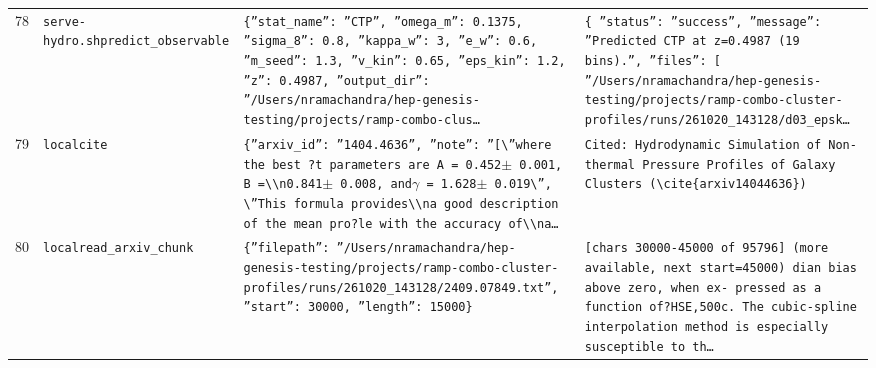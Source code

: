 \documentclass[11pt,a4paper]{article}
\begin{document}
\begin{longtable}{@{}p{}p{}p{}p{}@{}}
78 & \texttt{serve-hydro.sh}\newline\texttt{predict\_\allowbreak{}observable} & \texttt{\{''stat\_\allowbreak{}name'':\allowbreak{} ''CTP'',\allowbreak{} ''omega\_\allowbreak{}m'':\allowbreak{} 0.1375,\allowbreak{} ''sigma\_\allowbreak{}8'':\allowbreak{} 0.8,\allowbreak{} ''kappa\_\allowbreak{}w'':\allowbreak{} 3,\allowbreak{} ''e\_\allowbreak{}w'':\allowbreak{} 0.6,\allowbreak{} ''m\_\allowbreak{}seed'':\allowbreak{} 1.3,\allowbreak{} ''v\_\allowbreak{}kin'':\allowbreak{} 0.65,\allowbreak{} ''eps\_\allowbreak{}kin'':\allowbreak{} 1.2,\allowbreak{} ''z'':\allowbreak{} 0.4987,\allowbreak{} ''output\_\allowbreak{}dir'':\allowbreak{} ''/\allowbreak{}Users/\allowbreak{}nramachandra/\allowbreak{}hep-genesis-testing/\allowbreak{}projects/\allowbreak{}ramp-combo-clus\ldots{}\allowbreak{}} & \texttt{\{   ''status'':\allowbreak{} ''success'',\allowbreak{}   ''message'':\allowbreak{} ''Predicted CTP at z=\allowbreak{}0.4987 (19 bins)\allowbreak{}.'',\allowbreak{}   ''files'':\allowbreak{} [     ''/\allowbreak{}Users/\allowbreak{}nramachandra/\allowbreak{}hep-genesis-testing/\allowbreak{}projects/\allowbreak{}ramp-combo-cluster-profiles/\allowbreak{}runs/\allowbreak{}261020\_\allowbreak{}143128/\allowbreak{}d03\_\allowbreak{}epsk\ldots{}\allowbreak{}} \\
79 & \texttt{local}\newline\texttt{cite} & \texttt{\{''arxiv\_\allowbreak{}id'':\allowbreak{} ''1404.4636'',\allowbreak{} ''note'':\allowbreak{} ''[\textbackslash{}\allowbreak{}''where the best ?t parameters are A =\allowbreak{} 0.452$\pm$ 0.001,\allowbreak{} B =\allowbreak{}\textbackslash{}\allowbreak{}\textbackslash{}\allowbreak{}n0.841$\pm$ 0.008,\allowbreak{} and$\gamma$ =\allowbreak{} 1.628$\pm$ 0.019\textbackslash{}\allowbreak{}'',\allowbreak{} \textbackslash{}\allowbreak{}''This formula provides\textbackslash{}\allowbreak{}\textbackslash{}\allowbreak{}na good description of the mean pro?le with the accuracy of\textbackslash{}\allowbreak{}\textbackslash{}\allowbreak{}na\ldots{}\allowbreak{}} & \texttt{Cited:\allowbreak{} Hydrodynamic Simulation of Non-thermal Pressure Profiles of Galaxy Clusters (\textbackslash{}\allowbreak{}cite\{arxiv14044636\}\allowbreak{})\allowbreak{}} \\
80 & \texttt{local}\newline\texttt{read\_\allowbreak{}arxiv\_\allowbreak{}chunk} & \texttt{\{''filepath'':\allowbreak{} ''/\allowbreak{}Users/\allowbreak{}nramachandra/\allowbreak{}hep-genesis-testing/\allowbreak{}projects/\allowbreak{}ramp-combo-cluster-profiles/\allowbreak{}runs/\allowbreak{}261020\_\allowbreak{}143128/\allowbreak{}2409.07849.txt'',\allowbreak{} ''start'':\allowbreak{} 30000,\allowbreak{} ''length'':\allowbreak{} 15000\}\allowbreak{}} & \texttt{[chars 30000-45000 of 95796]\allowbreak{} (more available,\allowbreak{} next start=\allowbreak{}45000)\allowbreak{}  dian bias above zero,\allowbreak{} when ex- pressed as a function of?HSE,\allowbreak{}500c. The cubic-spline interpolation method is especially susceptible to th\ldots{}\allowbreak{}} \\

\end{longtable}
\end{document}
